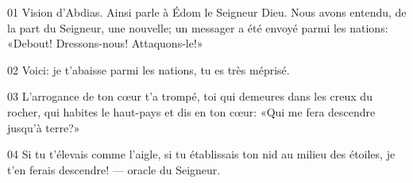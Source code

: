 01 Vision d’Abdias. Ainsi parle à Édom le Seigneur Dieu. Nous avons entendu, de la part du Seigneur, une nouvelle; un messager a été envoyé parmi les nations: «Debout! Dressons-nous! Attaquons-le!»

02 Voici: je t’abaisse parmi les nations, tu es très méprisé.

03 L’arrogance de ton cœur t’a trompé, toi qui demeures dans les creux du rocher, qui habites le haut-pays et dis en ton cœur: «Qui me fera descendre jusqu’à terre?»

04 Si tu t’élevais comme l’aigle, si tu établissais ton nid au milieu des étoiles, je t’en ferais descendre! --- oracle du Seigneur.
